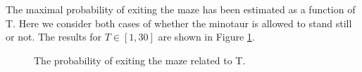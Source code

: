 \documentclass{article}
\begin{document}
The maximal probability of exiting the maze has been estimated as a function of T. Here we consider both cases of whether the minotaur is allowed to stand still or not. 
The results for $T\in [1,30]$ are shown in Figure \ref{probability}.
\begin{figure}[H]
  \caption{The probability of exiting the maze related to T.}
  \label{probability}
\end{figure}
\end{document}

